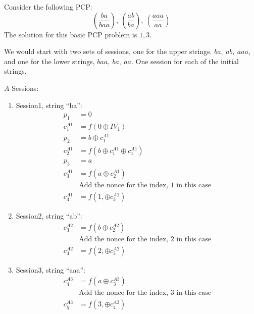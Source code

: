 \documentclass{llncs}
\begin{document}
\begin{example}
	Consider the following PCP:
	\[
	(\frac{ba}{baa}),~(\frac{ab}{ba}),~(\frac{aaa}{aa})
	\]
	The solution for this basic PCP problem is $1,3$.
	
	We would start with two sets of sessions, one for the 
	upper strings. $ba, ~ab, ~aaa$, and one for the lower
	strings, $baa, ~ba, ~aa$. One session for each of the initial strings. 
	
	\noindent
	$A$ Sessions:
	\begin{enumerate}
		\item Session1, string ``ba'':
		\begin{align*}
		p_1 &= 0\\
		c^{A1}_1 &= f(0 \oplus IV_{1})\\
		p_2 &= b \oplus c^{A1}_1\\
		c^{A1}_2 &= f(b \oplus c^{A1}_1 \oplus c^{A1}_1)\\
		p_3 &= a\\
		c^{A1}_3 &= f(a \oplus c^{A1}_2)\\
		&\text{Add the nonce for the index, 1 in this case}\\
		c^{A1}_4 &=f(1, \oplus c^{A1}_3)
		\end{align*}
		\item Session2, string ``ab'':
		\begin{align*}
		c^{A2}_3 &= f(b \oplus c^{A2}_2)\\
			&\text{Add the nonce for the index, 2 in this case}\\
			c^{A2}_4 &=f(2, \oplus c^{A2}_3)
		\end{align*}
		\item Session3, string ``aaa'':
		\begin{align*}
		c^{A3}_4 &= f(a \oplus c^{A3}_3)\\
			&\text{Add the nonce for the index, 3 in this case}\\
			c^{A3}_5 &=f(3, \oplus c^{A3}_4)
		\end{align*}
	\end{enumerate}
	

\end{example}
\end{document}
